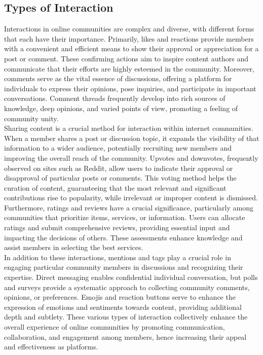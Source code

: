 \subsection{Types of Interaction}
Interactions in online communities are complex and diverse, with different forms that each have their importance. Primarily, likes and reactions provide members with a convenient and efficient means to show their approval or appreciation for a post or comment. These confirming actions aim to inspire content authors and communicate that their efforts are highly esteemed in the community. Moreover, comments serve as the vital essence of discussions, offering a platform for individuals to express their opinions, pose inquiries, and participate in important conversations. Comment threads frequently develop into rich sources of knowledge, deep opinions, and varied points of view, promoting a feeling of community unity. \\

Sharing content is a crucial method for interaction within internet communities. When a member shares a post or discussion topic, it expands the visibility of that information to a wider audience, potentially recruiting new members and improving the overall reach of the community. Upvotes and downvotes, frequently observed on sites such as Reddit, allow users to indicate their approval or disapproval of particular posts or comments. This voting method helps the curation of content, guaranteeing that the most relevant and significant contributions rise to popularity, while irrelevant or improper content is dismissed. Furthermore, ratings and reviews have a crucial significance, particularly among communities that prioritize items, services, or information. Users can allocate ratings and submit comprehensive reviews, providing essential input and impacting the decisions of others. These assessments enhance knowledge and assist members in selecting the best services. \\

In addition to these interactions, mentions and tags play a crucial role in engaging particular community members in discussions and recognizing their expertise. Direct messaging enables confidential individual conversation, but polls and surveys provide a systematic approach to collecting community comments, opinions, or preferences. Emojis and reaction buttons serve to enhance the expression of emotions and sentiments towards content, providing additional depth and subtlety. These various types of interaction collectively enhance the overall experience of online communities by promoting communication, collaboration, and engagement among members, hence increasing their appeal and effectiveness as platforms. \\


